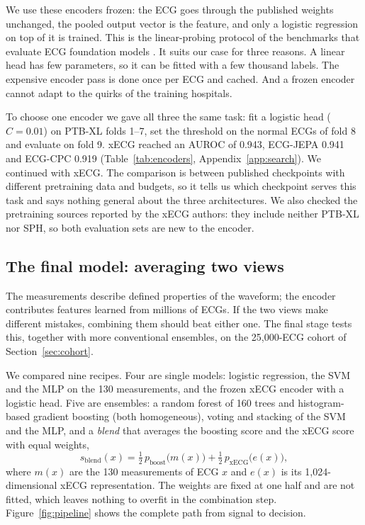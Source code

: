 \documentclass[letterpaper,11pt]{article}
\begin{document}
We use these encoders frozen: the ECG goes through the published weights unchanged, the pooled output vector is the feature, and only a logistic regression on top of it is trained. This is the linear-probing protocol of the benchmarks that evaluate ECG foundation models \parencite{almasud2025benchmarking,lunelli2026benchecg}. It suits our case for three reasons. A linear head has few parameters, so it can be fitted with a few thousand labels. The expensive encoder pass is done once per ECG and cached. And a frozen encoder cannot adapt to the quirks of the training hospitals.

To choose one encoder we gave all three the same task: fit a logistic head ($C = 0.01$) on PTB-XL folds 1--7, set the threshold on the normal ECGs of fold 8 and evaluate on fold 9. xECG reached an AUROC of 0.943, ECG-JEPA 0.941 and ECG-CPC 0.919 (Table~\ref{tab:encoders}, Appendix~\ref{app:search}). We continued with xECG. The comparison is between published checkpoints with different pretraining data and budgets, so it tells us which checkpoint serves this task and says nothing general about the three architectures. We also checked the pretraining sources reported by the xECG authors: they include neither PTB-XL nor SPH, so both evaluation sets are new to the encoder.

\subsection{The final model: averaging two views}

The measurements describe defined properties of the waveform; the encoder contributes features learned from millions of ECGs. If the two views make different mistakes, combining them should beat either one. The final stage tests this, together with more conventional ensembles, on the 25,000-ECG cohort of Section~\ref{sec:cohort}.

We compared nine recipes. Four are single models: logistic regression, the SVM and the MLP on the 130 measurements, and the frozen xECG encoder with a logistic head. Five are ensembles: a random forest of 160 trees and histogram-based gradient boosting (both homogeneous), voting and stacking of the SVM and the MLP, and a \emph{blend} that averages the boosting score and the xECG score with equal weights,
\begin{equation}
  s_{\text{blend}}(x) = \tfrac{1}{2}\, p_{\text{boost}}\big(m(x)\big) + \tfrac{1}{2}\, p_{\text{xECG}}\big(e(x)\big),
\end{equation}
where $m(x)$ are the 130 measurements of ECG $x$ and $e(x)$ is its 1,024-dimensional xECG representation. The weights are fixed at one half and are not fitted, which leaves nothing to overfit in the combination step. Figure~\ref{fig:pipeline} shows the complete path from signal to decision.
\end{document}
